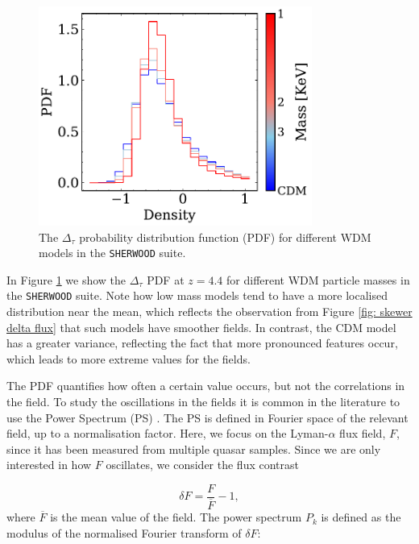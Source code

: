 \begin{figure}[ht]
        \centering
            \includegraphics[width=0.8\textwidth]{img/ML/pdf_density_sherwood.pdf}
            \caption{The $\Delta_\tau$ probability distribution function (PDF) for different WDM models in the \texttt{SHERWOOD} suite.}
            \label{fig: exact density PDF}
\end{figure}


In Figure \ref{fig: exact density PDF} we show the $\Delta_\tau$ PDF at $z=4.4$ for different WDM particle masses in the \texttt{SHERWOOD} suite. Note how low mass models tend to have a more localised distribution near the mean, which reflects the observation from Figure \ref{fig: skewer delta flux} that such models have smoother fields. In contrast, the CDM model has a greater variance, reflecting the fact that more pronounced features occur, which leads to more extreme values for the fields. 

The PDF quantifies how often a certain value occurs, but not the correlations in the field. To study the oscillations in the fields it is common in the literature to use the Power Spectrum (PS) \cite{McDonald_2006,Ravoux_2023}. The PS is defined in Fourier space of the relevant field, up to a normalisation factor. Here, we focus on the Lyman-$\alpha$ flux field, $F$, since it has been measured from multiple quasar samples. Since we are only interested in how $F$ oscillates, we consider the flux contrast

\begin{equation}\label{eq: flux contrast}
        \delta F=\frac{F}{\overline{F}} -1,
\end{equation}
where $\overline{F}$ is the mean value of the field. The power spectrum $P_k$ is defined as the modulus of the normalised Fourier transform of $\delta F$:

